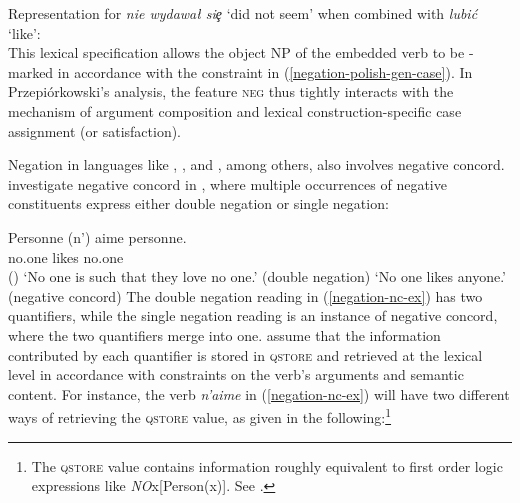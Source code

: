 \documentclass[output=paper,biblatex,babelshorthands,newtxmath,draftmode,colorlinks,citecolor=brown]{langscibook}
\begin{document}
\begin{exe}
\begin{xlist}
\begin{exe}
\begin{xlist}
\ea
\label{negation-polish-case}
Representation for \emph{nie wydawał siȩ} `did not seem' when combined with \emph{lubić} `like':\\
\z
%
This lexical specification allows the object NP of the embedded verb to be
-marked in accordance with the constraint in (\ref{negation-polish-gen-case}).
In Przepiórkowski's analysis, the feature
\textsc{neg} thus tightly interacts with the mechanism of argument composition and
lexical construction-specific case assignment (or satisfaction).

Negation in languages like , , and , among others, also involves negative concord.
 investigate  negative concord in , where multiple occurrences
of negative constituents express either
double negation or single negation:

\ea \label{negation-nc-ex}
\gll Personne (n')                 aime personne.\\
     no.one   \hphantom{(}\NEG{} likes no.one\\\hfill()
\glt `No one is such that they love no one.' \hfill (double negation)
\glt `No one likes anyone.' \hfill  (negative concord)
\z
%
%
The double negation reading in (\ref{negation-nc-ex}) has two quantifiers, while the single
negation reading is an instance of negative concord, where the two
quantifiers merge into one.  assume that the information contributed by
each quantifier is stored in \textsc{qstore} and retrieved at the
lexical level in accordance with constraints on the verb's arguments and semantic
content. For instance, the verb \textit{n'aime} in (\ref{negation-nc-ex}) will have two different ways of retrieving the
\textsc{qstore} value, as given in the following:\footnote{The
\textsc{qstore} value contains information
roughly equivalent to first order logic expressions like \textit{NO}x[Person(x)]. See
\citet{Swart:02}.}


\end{xlist}
\end{exe}
\end{xlist}
\end{exe}
\end{document}
